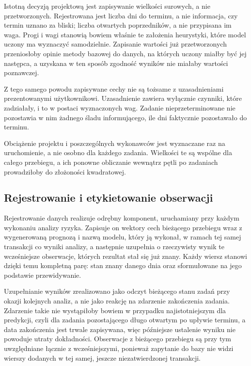 Istotną decyzją projektową jest zapisywanie wielkości surowych, a nie przetworzonych. Rejestrowana jest liczba dni do terminu, a nie informacja, czy termin uznano za bliski; liczba otwartych poprzedników, a nie przypisana im waga. Progi i wagi stanowią bowiem właśnie te założenia heurystyki, które model uczony ma wyznaczyć samodzielnie. Zapisanie wartości już przetworzonych przeniosłoby opinie metody bazowej do danych, na których uczony miałby być jej następca, a uzyskana w ten sposób zgodność wyników nie miałaby wartości poznawczej.

Z tego samego powodu zapisywane cechy nie są tożsame z uzasadnieniami prezentowanymi użytkownikowi. Uzasadnienie zawiera wyłącznie czynniki, które zadziałały, i to w postaci wyznaczonych wag. Zadanie nieprzeterminowane nie pozostawia w nim żadnego śladu informującego, ile dni faktycznie pozostawało do terminu.

Obciążenie projektu i poszczególnych wykonawców jest wyznaczane raz na uruchomienie, a nie osobno dla każdego zadania. Wielkości te są wspólne dla całego przebiegu, a ich ponowne obliczanie wewnątrz pętli po zadaniach prowadziłoby do złożoności kwadratowej.

\subsection{Rejestrowanie i etykietowanie obserwacji}

Rejestrowanie danych realizuje odrębny komponent, uruchamiany przy każdym wykonaniu analizy ryzyka. Zapisuje on wektory cech bieżącego przebiegu wraz z wygenerowaną prognozą i nazwą modelu, który ją wykonał, w ramach tej samej transakcji co wyniki analizy, a następnie uzupełnia o rzeczywisty wynik te wcześniejsze obserwacje, których rezultat stał się już znany. Każdy wiersz stanowi dzięki temu kompletną parę: stan znany danego dnia oraz sformułowane na jego podstawie przewidywanie.

Uzupełnianie wyników zrealizowano jako odczyt bieżącego stanu zadań przy okazji kolejnych analiz, a nie jako reakcję na zdarzenie zakończenia zadania. Zdarzenie takie nie wystąpiłoby bowiem w przypadku najistotniejszym dla predykcji, czyli dla zadania pozostającego długo otwartym po upływie terminu, a data zakończenia jest trwale zapisywana, więc późniejsze ustalenie wyniku nie powoduje utraty dokładności. Obserwacje z bieżącego przebiegu są przy tym uwzględniane łącznie z wcześniejszymi, ponieważ zapytanie do bazy nie widzi wierszy dodanych w tej samej, jeszcze niezatwierdzonej transakcji.

